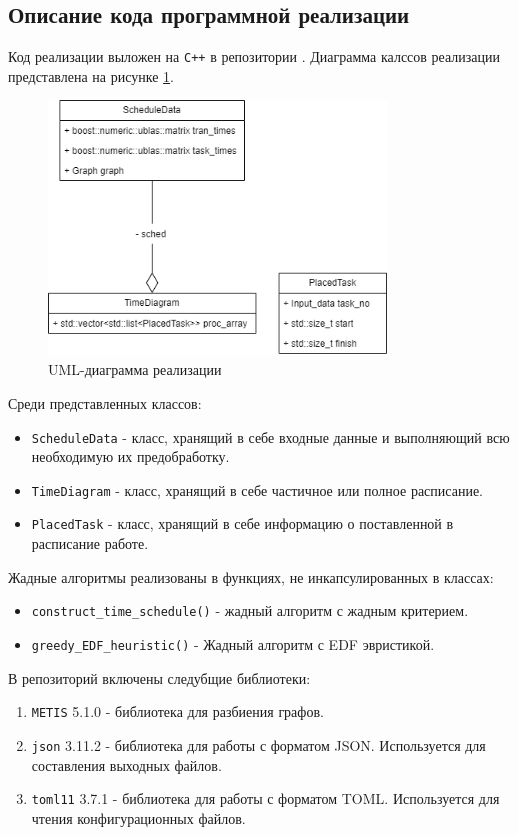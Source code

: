 \subsection{Описание кода программной реализации}
Код реализации выложен на \texttt{C++} в репозитории \cite{Repository}. Диаграмма калссов реализации представлена на рисунке \ref{fig:UML}.

\begin{figure}[!htbp]
    \centering
    \includegraphics[width=0.8\textwidth]{imgs/final_UML.drawio.png}
    \caption{UML-диаграмма реализации}
    \label{fig:UML}
\end{figure}

Среди представленных классов:
\begin{itemize}
    \item \texttt{ScheduleData} - класс, хранящий в себе входные данные и выполняющий всю необходимую их предобработку.
    \item \texttt{TimeDiagram} - класс, хранящий в себе частичное или полное расписание.
    \item \texttt{PlacedTask} - класс, хранящий в себе информацию о поставленной в расписание работе.
\end{itemize}

Жадные алгоритмы реализованы в функциях, не инкапсулированных в классах:
\begin{itemize}
    \item \texttt{construct_time_schedule()} - жадный алгоритм с жадным критерием.
    \item \texttt{greedy_EDF_heuristic()} - Жадный алгоритм с EDF эвристикой.
\end{itemize}

В репозиторий включены следубщие библиотеки:
\begin{enumerate}
    \item \texttt{METIS} 5.1.0 \cite{METIS_lib} - библиотека для разбиения графов.
    \item \texttt{json} 3.11.2 \cite{json_lib} - библиотека для работы с форматом JSON. Используется для составления выходных файлов.
    \item \texttt{toml11} 3.7.1 \cite{toml11_lib} - библиотека для работы с форматом TOML. Используется для чтения конфигурационных файлов.
\end{enumerate}


